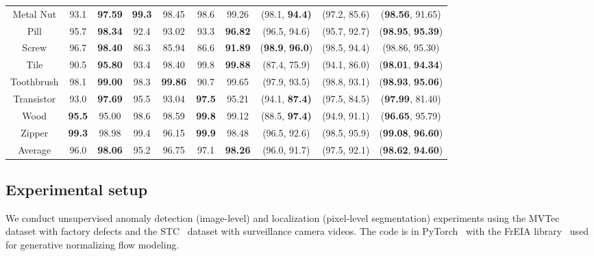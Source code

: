 \documentclass[10pt,twocolumn,letterpaper]{article}
\begin{document}
\begin{table*}[ht]
\begin{tabular}{c|cc|cccc|ccc}
		Metal Nut  & 93.1 & \textbf{97.59}        & \textbf{99.3} & 98.45 & 98.6 & 99.26                   & (98.1, \textbf{94.4)} & (97.2, 85.6) & (\textbf{98.56}, 91.65) \\
		Pill       & 95.7 & \textbf{98.34}        & 92.4 & 93.02          & 93.3 & \textbf{96.82}          & (96.5, 94.6)          & (95.7, 92.7) & (\textbf{98.95}, \textbf{95.39}) \\
		Screw      & 96.7 & \textbf{98.40}        & 86.3 & 85.94          & 86.6 & \textbf{91.89}          & (\textbf{98.9}, \textbf{96.0}) & (98.5, 94.4) & (98.86, 95.30) \\
		Tile       & 90.5 & \textbf{95.80}        & 93.4 & 98.40          & 99.8 & \textbf{99.88}          & (87.4, 75.9)          & (94.1, 86.0) & (\textbf{98.01}, \textbf{94.34}) \\
		Toothbrush & 98.1 & \textbf{99.00}        & 98.3 & \textbf{99.86} & 90.7 & 99.65                   & (97.9, 93.5)          & (98.8, 93.1) & (\textbf{98.93}, \textbf{95.06}) \\
		Transistor & 93.0 & \textbf{97.69}        & 95.5 & 93.04          & \textbf{97.5} & 95.21          & (94.1, \textbf{87.4)} & (97.5, 84.5) & (\textbf{97.99}, 81.40) \\
		Wood       & \textbf{95.5} & 95.00        & 98.6 & 98.59          & \textbf{99.8} & 99.12          & (88.5, \textbf{97.4)} & (94.9, 91.1) & (\textbf{96.65}, 95.79) \\
		Zipper     & \textbf{99.3} & 98.98        & 99.4 & 96.15          & \textbf{99.9} & 98.48          & (96.5, 92.6)          & (98.5, 95.9) & (\textbf{99.08}, \textbf{96.60}) \\
		\midrule
		Average    & 96.0 & \textbf{98.06}        & 95.2 & 96.75          & 97.1 & \textbf{98.26}          & (96.0, 91.7) & (97.5, 92.1) & (\textbf{98.62}, \textbf{94.60}) \\
		\bottomrule
	\end{tabular}
\end{table*}

\subsection{Experimental setup}
\label{subsec:setup_eval}
We conduct unsupervised anomaly detection (image-level) and localization (pixel-level segmentation) experiments using the MVTec~\cite{Bergmann_2019_CVPR} dataset with factory defects and the STC~\cite{Luo_2017_ICCV} dataset with surveillance camera videos. The code is in PyTorch~\cite{paszke2017automatic} with the FrEIA library~\cite{ardizzone2018analyzing} used for generative normalizing flow modeling.
\end{document}
